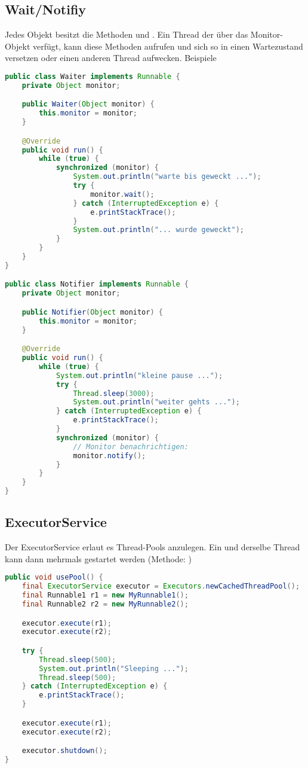 \subsection{Wait/Notifiy}
Jedes Objekt besitzt die Methoden  und . Ein Thread der über das Monitor-Objekt verfügt, kann diese Methoden aufrufen und sich so in einen Wartezustand versetzen oder einen anderen Thread aufwecken. Beispiele
\begin{lstlisting}[language=Java]
public class Waiter implements Runnable {
	private Object monitor;

	public Waiter(Object monitor) {
		this.monitor = monitor;
	}

	@Override
	public void run() {
		while (true) {
			synchronized (monitor) {
				System.out.println("warte bis geweckt ..."); 
				try {
					monitor.wait();
				} catch (InterruptedException e) {
					e.printStackTrace();
				}
				System.out.println("... wurde geweckt");
			}
		}
	}
}

public class Notifier implements Runnable {
	private Object monitor;

	public Notifier(Object monitor) {
		this.monitor = monitor;
	}

	@Override
	public void run() {
		while (true) {
			System.out.println("kleine pause ...");
			try {
				Thread.sleep(3000);
				System.out.println("weiter gehts ...");
			} catch (InterruptedException e) {
				e.printStackTrace();
			}
			synchronized (monitor) {
				// Monitor benachrichtigen:
				monitor.notify();
			}
		}
	}
}
\end{lstlisting}

\subsection{ExecutorService}
Der ExecutorService erlaut es Thread-Pools anzulegen. Ein und derselbe Thread kann
dann mehrmals gestartet werden (Methode: )

\begin{lstlisting}[language=Java]
public void usePool() {
	final ExecutorService executor = Executors.newCachedThreadPool();
	final Runnable1 r1 = new MyRunnable1();
	final Runnable2 r2 = new MyRunnable2();

	executor.execute(r1);
	executor.execute(r2);

	try {
		Thread.sleep(500);
		System.out.println("Sleeping ...");
		Thread.sleep(500);
	} catch (InterruptedException e) {
		e.printStackTrace();
	}

	executor.execute(r1);
	executor.execute(r2);

	executor.shutdown();
}
\end{lstlisting}

